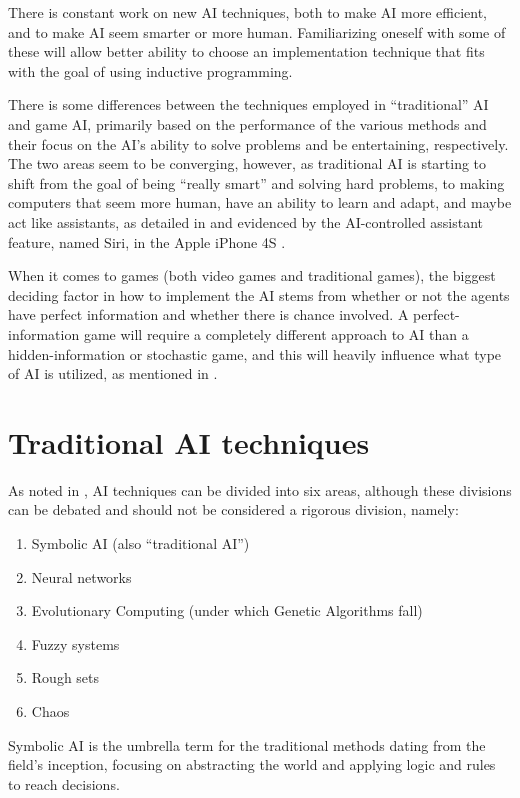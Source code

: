 \documentclass[]{report}
\begin{document}
There is constant work on new AI techniques, both to make AI more efficient, and
to make AI seem smarter or more human. Familiarizing oneself with some of these
will allow better ability to choose an implementation technique that fits with
the goal of using inductive programming.

There is some differences between the techniques employed in ``traditional'' AI
and game AI, primarily based on the performance of the various methods and their
focus on the AI's ability to solve problems and be entertaining,
respectively. The two areas seem to be converging, however, as traditional AI is
starting to shift from the goal of being ``really smart'' and solving hard
problems, to making computers that seem more human, have an ability to learn and
adapt, and maybe act like assistants, as detailed in \citet[][]{ramos2008guest}
and evidenced by the AI-controlled assistant feature, named Siri, in the
Apple iPhone 4S \citep{apple2011siri}.

When it comes to games (both video games and traditional games), the biggest
deciding factor in how to implement the AI stems from whether or not the agents
have perfect information and whether there is chance involved. A
perfect-information game will require a completely different approach to AI than
a hidden-information or stochastic game, and this will heavily influence what
type of AI is utilized, as mentioned in \citet[pg.~4-5]{schaeffer2002games}.

\section{Traditional AI techniques}
\label{sec:trad-ai-techn}

As noted in \citet[chap.~1]{munakata2008fundamentals}, AI techniques can be
divided into six areas, although these divisions can be debated and should not
be considered a rigorous division, namely:

\begin{enumerate}
\item Symbolic AI (also ``traditional AI'')
\item Neural networks
\item Evolutionary Computing (under which Genetic Algorithms fall)
\item Fuzzy systems
\item Rough sets
\item Chaos
\end{enumerate}

Symbolic AI is the umbrella term for the traditional methods dating from the
field's inception, focusing on abstracting the world and applying logic and
rules to reach decisions.
\end{document}

